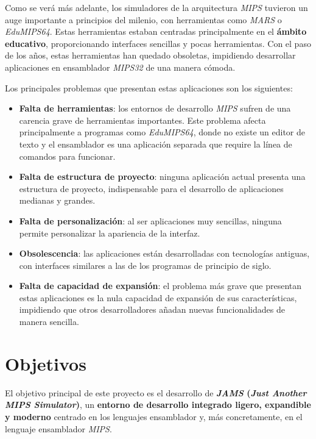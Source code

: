 Como se verá más adelante, los simuladores de la arquitectura \textit{MIPS} tuvieron
un auge importante a principios del milenio, con herramientas como \textit{MARS}\cite{MARS}
o \textit{EduMIPS64}\cite{EDUMIPS64}.
Estas herramientas estaban centradas principalmente en el \textbf{ámbito educativo}, proporcionando
interfaces sencillas y pocas herramientas.
Con el paso de los años, estas herramientas han quedado obsoletas, impidiendo desarrollar aplicaciones
en ensamblador \textit{MIPS32} de una manera cómoda.

\noindent Los principales problemas que presentan estas aplicaciones son los siguientes:
\begin{itemize}
    \item \textbf{Falta de herramientas}: los entornos de desarrollo \textit{MIPS} sufren de una
    carencia grave de herramientas importantes.
    Este problema afecta principalmente a programas como \textit{EduMIPS64}, donde no existe un editor de texto y
    el ensamblador es una aplicación separada que require la línea de comandos para funcionar.
    \item \textbf{Falta de estructura de proyecto}: ninguna aplicación actual presenta una estructura
    de proyecto, indispensable para el desarrollo de aplicaciones medianas y grandes.
    \item \textbf{Falta de personalización}: al ser aplicaciones muy sencillas, ninguna permite
    personalizar la apariencia de la interfaz.
    \item \textbf{Obsolescencia}: las aplicaciones están desarrolladas con tecnologías antiguas,
    con interfaces similares a las de los programas de principio de siglo.
    \item \textbf{Falta de capacidad de expansión}: el problema más grave que presentan estas aplicaciones
    es la nula capacidad de expansión de sus características, impidiendo que otros desarrolladores
    añadan nuevas funcionalidades de manera sencilla.
\end{itemize}


\section{Objetivos}\label{sec:objetivos}

El objetivo principal de este proyecto es el desarrollo de \textbf{\textit{JAMS}
(\textit{Just Another MIPS Simulator})}, un \textbf{entorno de desarrollo integrado ligero, expandible y moderno}
centrado en los lenguajes ensamblador y, más concretamente, en el lenguaje ensamblador \textit{MIPS}.

